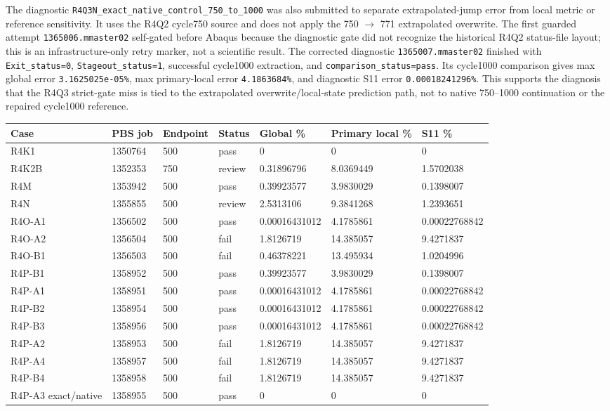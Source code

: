 \documentclass{article}
\begin{document}
The diagnostic \texttt{R4Q3N\_exact\_native\_control\_750\_to\_1000} was also submitted to separate extrapolated-jump error from local metric or reference sensitivity. It uses the R4Q2 cycle750 source and does not apply the 750 \(\rightarrow\) 771 extrapolated overwrite. The first guarded attempt \texttt{1365006.mmaster02} self-gated before Abaqus because the diagnostic gate did not recognize the historical R4Q2 status-file layout; this is an infrastructure-only retry marker, not a scientific result. The corrected diagnostic \texttt{1365007.mmaster02} finished with \texttt{Exit\_status=0}, \texttt{Stageout\_status=1}, successful cycle1000 extraction, and \texttt{comparison\_status=pass}. Its cycle1000 comparison gives max global error \texttt{3.1625025e-05\%}, max primary-local error \texttt{4.1863684\%}, and diagnostic S11 error \texttt{0.00018241296\%}. This supports the diagnosis that the R4Q3 strict-gate miss is tied to the extrapolated overwrite/local-state prediction path, not to native 750--1000 continuation or the repaired cycle1000 reference.

\small
\setlength{\tabcolsep}{3pt}
\begin{longtable}{p{}p{}p{}p{}p{}p{}p{}}
\toprule
Case & PBS job & Endpoint & Status & Global \% & Primary local \% & S11 \% \\
\midrule
R4K1 & 1350764 & 500 & pass & 0 & 0 & 0 \\
R4K2B & 1352353 & 750 & review & 0.31896796 & 8.0369449 & 1.5702038 \\
R4M & 1353942 & 500 & pass & 0.39923577 & 3.9830029 & 0.1398007 \\
R4N & 1355855 & 500 & review & 2.5313106 & 9.3841268 & 1.2393651 \\
R4O-A1 & 1356502 & 500 & pass & 0.00016431012 & 4.1785861 & 0.00022768842 \\
R4O-A2 & 1356504 & 500 & fail & 1.8126719 & 14.385057 & 9.4271837 \\
R4O-B1 & 1356503 & 500 & fail & 0.46378221 & 13.495934 & 1.0204996 \\
R4P-B1 & 1358952 & 500 & pass & 0.39923577 & 3.9830029 & 0.1398007 \\
R4P-A1 & 1358951 & 500 & pass & 0.00016431012 & 4.1785861 & 0.00022768842 \\
R4P-B2 & 1358954 & 500 & pass & 0.00016431012 & 4.1785861 & 0.00022768842 \\
R4P-B3 & 1358956 & 500 & pass & 0.00016431012 & 4.1785861 & 0.00022768842 \\
R4P-A2 & 1358953 & 500 & fail & 1.8126719 & 14.385057 & 9.4271837 \\
R4P-A4 & 1358957 & 500 & fail & 1.8126719 & 14.385057 & 9.4271837 \\
R4P-B4 & 1358958 & 500 & fail & 1.8126719 & 14.385057 & 9.4271837 \\
R4P-A3 exact/native & 1358955 & 500 & pass & 0 & 0 & 0 \\
\bottomrule
\end{longtable}
\setlength{\tabcolsep}{6pt}
\normalsize
\end{document}
